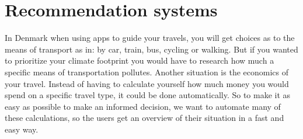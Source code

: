 \section{Recommendation systems}\label{sec:recommendation-systems}

In Denmark when using apps to guide your travels, you will get choices as to the means of transport as in: by car,
train, bus, cycling or walking.
But if you wanted to prioritize your climate footprint you would have to research how much a specific means of
transportation pollutes.
Another situation is the economics of your travel.
Instead of having to calculate yourself how much money you would spend on a specific travel type, it could be done
automatically.
So to make it as easy as possible to make an informed decision, we want to automate many of these calculations, so the
users get an overview of their situation in a fast and easy way.

